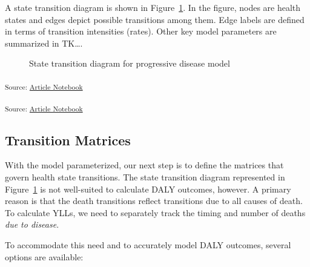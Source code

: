 \documentclass[
]{agujournal2019}
\begin{document}
A state transition diagram is shown in Figure~\ref{fig-model1}. In the
figure, nodes are health states and edges depict possible transitions
among them. Edge labels are defined in terms of transition intensities
(rates). Other key model parameters are summarized in TK\ldots.

\begin{figure}


\caption{\label{fig-model1}State transition diagram for progressive
disease model}

\end{figure}%

\textsubscript{Source:
\href{https://graveja0.github.io/dalys/index.qmd.html}{Article
Notebook}}

\textsubscript{Source:
\href{https://graveja0.github.io/dalys/index.qmd.html}{Article
Notebook}}

\subsection{Transition Matrices}\label{transition-matrices}

With the model parameterized, our next step is to define the matrices
that govern health state transitions. The state transition diagram
represented in Figure~\ref{fig-model1} is not well-suited to calculate
DALY outcomes, however. A primary reason is that the death transitions
reflect transitions due to all causes of death. To calculate YLLs, we
need to separately track the timing and number of deaths \emph{due to
disease}.

To accommodate this need and to accurately model DALY outcomes, several
options are available:
\end{document}
